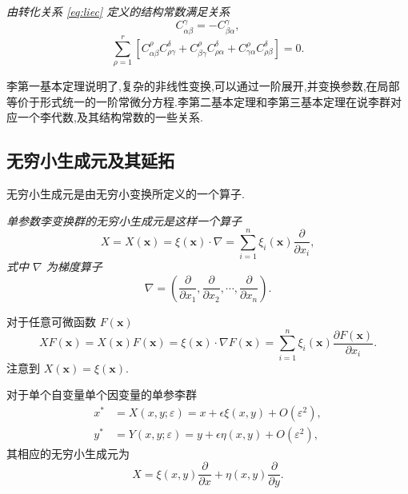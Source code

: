 \begin{theorem}[李第三基本定理]
\emph{由转化关系 \eqref{eq:liec} 定义的结构常数满足关系
\begin{equation*}
C_{\alpha\beta}^{\gamma}=-C_{\beta\alpha}^{\gamma},
\end{equation*}
\begin{equation*}
\sum_{\rho=1}^{r}[C_{\alpha\beta}^{\rho}C_{\rho\gamma}^{\delta}+C_{\beta\gamma}^{\rho}C_{\rho\alpha}^{\delta}+C_{\gamma\alpha}^{\rho}C_{\rho\beta}^{\delta}]=0.
\end{equation*}}
\end{theorem}

李第一基本定理说明了,复杂的非线性变换,可以通过一阶展开,并变换参数,在局部等价于形式统一的一阶常微分方程.李第二基本定理和李第三基本定理在说李群对应一个李代数,及其结构常数的一些关系.

\subsection{无穷小生成元及其延拓}
无穷小生成元是由无穷小变换所定义的一个算子.
\begin{definition}[无穷小生成元]
\emph{	单参数李变换群的无穷小生成元是这样一个算子
	\begin{equation*}
		X=X(\mathbf{x})=\xi(\mathbf{x})\cdot \nabla = \sum_{i=1}^{n}\xi_i(\mathbf{x})\frac{\partial}{\partial x_i},
	\end{equation*}
	式中 $\nabla$ 为梯度算子
	\begin{equation*}
		\nabla=\left(\frac{\partial}{\partial x_1},\frac{\partial}{\partial x_2},\cdots,\frac{\partial}{\partial x_n}\right).
	\end{equation*}}
\end{definition}

对于任意可微函数 $F(\mathbf{x})$
\begin{equation*}
	XF(\mathbf{x})=X(\mathbf{x})F(\mathbf{x})=\xi(\mathbf{x})\cdot \nabla F(\mathbf{x}) = \sum_{i=1}^{n}\xi_i(\mathbf{x})\frac{\partial F(\mathbf{x})}{\partial x_i}.
\end{equation*}
注意到 $X(\mathbf{x})=\xi(\mathbf{x})$.

对于单个自变量单个因变量的单参李群
\begin{equation*}
\begin{aligned}
x^*&=X(x,y;\varepsilon)=x+\epsilon \xi(x,y)+O(\varepsilon^2),\\
y^*&=Y(x,y;\varepsilon)=y+\epsilon \eta(x,y)+O(\varepsilon^2),
\end{aligned}
\end{equation*}
其相应的无穷小生成元为
\begin{equation*}
X=\xi(x,y)\frac{\partial}{\partial x}+\eta(x,y)\frac{\partial}{\partial y}.
\end{equation*}

